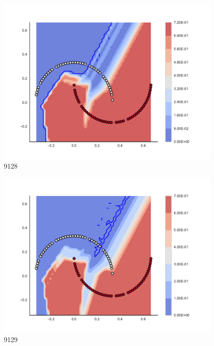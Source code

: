 \begin{subfigure}[b]{0.09\textwidth}
    \includegraphics[clip, trim=2.35cm 1.75cm 4.5cm 0cm,width=\textwidth]{img/convergence/9128.pdf}
    \caption{9128}
    \label{fig:convergence_9128}
\end{subfigure}
%
\begin{subfigure}[b]{0.09\textwidth}
    \includegraphics[clip, trim=2.35cm 1.75cm 4.5cm 0cm,width=\textwidth]{img/convergence/9129.pdf}
    \caption{9129}
    \label{fig:convergence_9129}
\end{subfigure}
%
